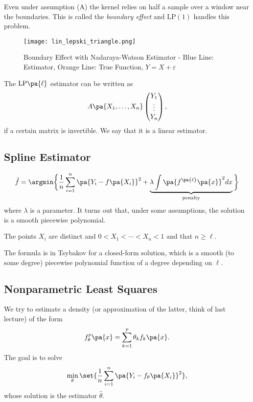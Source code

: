 Even under assumption (A) the kernel relies on half a sample over a window near the boundaries. This is called the \textit{boundary effect} and $\mathrm{LP}(1)$ handles this problem.

\begin{figure}[h]
  \centering
  \texttt{[image: lin\_lepski\_triangle.png]}
  \caption{\centering Boundary Effect with Nadaraya-Watson Estimator - Blue Line: Estimator, Orange Line: True Function, $Y = X + \varepsilon$}
\end{figure}

The $\mathrm{LP}\pa{\ell}$ estimator can be written as
\begin{equation}
  A\pa{X_1,\ldots, X_n}\begin{pmatrix} Y_1 \\ \vdots \\ Y_n\end{pmatrix},
\end{equation}
if a certain matrix is invertible. We say that it is a linear estimator.
\subsection{Spline Estimator}
\begin{equation}
\hat {f} = \argmin \bigg\{\frac{1}{n} \sum_{i=1}^n\pa{Y_i-f\pa{X_i}}^2+\underbrace{\lambda\int\pa{f^{\pa{\ell }}\pa{x} }^2 dx}_{\text{penalty}}\bigg\}
\end{equation} where $\lambda$ is a parameter. It turns out that, under some assumptions, the solution is a smooth piecewise polynomial.

\begin{assumption}[SP]
The points $X_i$ are distinct and $0< X_1 < \cdots < X_n <1$ and that $n\geq \ell$.
\end{assumption}
The formula is in Tsybakov for a closed-form solution, which is a smooth (to some degree) piecewise polynomial function of a degree depending on $\ell$.

\subsection{Nonparametric Least Squares}
We try to estimate a density (or approximation of the latter, think of last lecture) of the form
\begin{equation}
f^p_\theta\pa{x} = \sum_{k=1}^p \theta_k f_k\pa{x}.
\end{equation}
The goal is to solve
\begin{equation}
  \min_{\theta} \set{\frac{1}{n}\sum_{i=1}^n \pa{Y_i - f_\theta \pa{X_i}}^2 },
\end{equation}
whose solution is the estimator $\hat{\theta}$.

